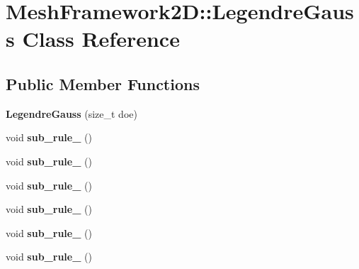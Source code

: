 \hypertarget{classMeshFramework2D_1_1LegendreGauss}{}\section{Mesh\+Framework2D\+:\+:Legendre\+Gauss Class Reference}
\label{classMeshFramework2D_1_1LegendreGauss}
\subsection*{Public Member Functions}
\begin{DoxyCompactItemize}
\item 
\mbox{\label{classMeshFramework2D_1_1LegendreGauss_a4df4c78f50b0116cb68151073a45e08a}} 
{\bfseries Legendre\+Gauss} (size\+\_\+t doe)
\item 
\mbox{\label{classMeshFramework2D_1_1LegendreGauss_aa60072df54f7acc9bad7362e4d6f6f72}} 
void {\bfseries sub\+\_\+rule\+\_} ()
\item 
\mbox{\label{classMeshFramework2D_1_1LegendreGauss_a3b20f2cc13f96879fe731e3411e118cf}} 
void {\bfseries sub\+\_\+rule\+\_} ()
\item 
\mbox{\label{classMeshFramework2D_1_1LegendreGauss_a0ee58d8688bfaaa7952cd7f70e06ad05}} 
void {\bfseries sub\+\_\+rule\+\_} ()
\item 
\mbox{\label{classMeshFramework2D_1_1LegendreGauss_a55751cb4eed2cd44b12fe7bcc505097a}} 
void {\bfseries sub\+\_\+rule\+\_} ()
\item 
\mbox{\label{classMeshFramework2D_1_1LegendreGauss_aa4e7cbaed5cea19a7490501e67bf728b}} 
void {\bfseries sub\+\_\+rule\+\_} ()
\item 
\mbox{\label{classMeshFramework2D_1_1LegendreGauss_aff68078ed4cdc77372609b56c3fcfc2a}} 
void {\bfseries sub\+\_\+rule\+\_} ()
\item 
\mbox{\label{classMeshFramework2D_1_1LegendreGauss_a70452a921cb1f1eb6e30d7436102ae01}} 

\end{DoxyCompactItemize}
